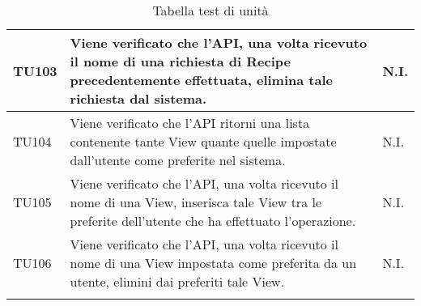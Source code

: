 \begin{center}
\begin{longtable}{| p{2cm} | p{8cm} | p{2.5cm} |}
					\hline
					TU103 & Viene verificato che l'API, una volta ricevuto il nome di una richiesta di Recipe precedentemente effettuata, elimina tale richiesta dal sistema. & N.I.\\
					\hline
					TU104 & Viene verificato che l'API ritorni una lista contenente tante View quante quelle impostate dall'utente come preferite nel sistema. & N.I.\\
					\hline
					TU105 & Viene verificato che l'API, una volta ricevuto il nome di una View, inserisca tale View tra le preferite dell'utente che ha effettuato l'operazione. & N.I.\\
					\hline
					TU106 & Viene verificato che l'API, una volta ricevuto il nome di una View impostata come preferita da un utente, elimini dai preferiti tale View. & N.I.\\
					\hline
					\caption{Tabella test di unità}
			\end{longtable}
			\egroup
			\end{center}
			
